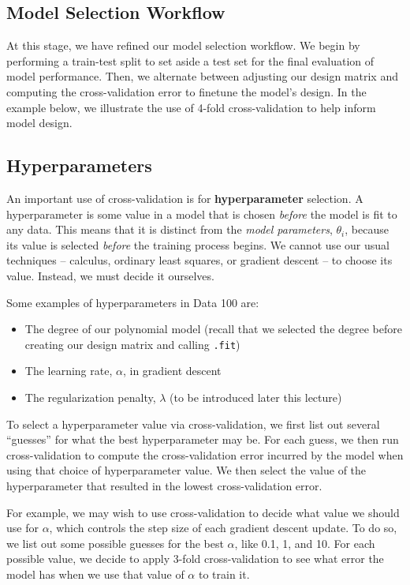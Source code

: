 \documentclass[
  letterpaper,
  DIV=11,
  numbers=noendperiod]{scrreprt}
\providecommand{\tightlist}{%
  \setlength{\itemsep}{0pt}\setlength{\parskip}{0pt}}\usepackage{longtable,booktabs,array}
\begin{document}
\subsection{Model Selection Workflow}\label{model-selection-workflow}

At this stage, we have refined our model selection workflow. We begin by
performing a train-test split to set aside a test set for the final
evaluation of model performance. Then, we alternate between adjusting
our design matrix and computing the cross-validation error to finetune
the model's design. In the example below, we illustrate the use of
4-fold cross-validation to help inform model design.

\subsection{Hyperparameters}\label{hyperparameters}

An important use of cross-validation is for \textbf{hyperparameter}
selection. A hyperparameter is some value in a model that is chosen
\emph{before} the model is fit to any data. This means that it is
distinct from the \emph{model parameters}, \(\theta_i\), because its
value is selected \emph{before} the training process begins. We cannot
use our usual techniques -- calculus, ordinary least squares, or
gradient descent -- to choose its value. Instead, we must decide it
ourselves.

Some examples of hyperparameters in Data 100 are:

\begin{itemize}
\tightlist
\item
  The degree of our polynomial model (recall that we selected the degree
  before creating our design matrix and calling \texttt{.fit})
\item
  The learning rate, \(\alpha\), in gradient descent
\item
  The regularization penalty, \(\lambda\) (to be introduced later this
  lecture)
\end{itemize}

To select a hyperparameter value via cross-validation, we first list out
several ``guesses'' for what the best hyperparameter may be. For each
guess, we then run cross-validation to compute the cross-validation
error incurred by the model when using that choice of hyperparameter
value. We then select the value of the hyperparameter that resulted in
the lowest cross-validation error.

For example, we may wish to use cross-validation to decide what value we
should use for \(\alpha\), which controls the step size of each gradient
descent update. To do so, we list out some possible guesses for the best
\(\alpha\), like 0.1, 1, and 10. For each possible value, we decide to
apply 3-fold cross-validation to see what error the model has when we
use that value of \(\alpha\) to train it.
\end{document}
